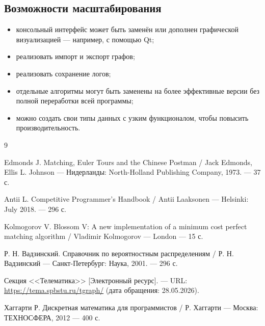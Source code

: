 \documentclass[14pt,a4paper]{extarticle}
\begin{document}
\subsection{Возможности масштабирования}

\begin{itemize}
    \item консольный интерфейс может быть заменён или дополнен графической визуализацией --- например, с помощью Qt;
    \item реализовать импорт и экспорт графов;
    \item реализовать сохранение логов;
    \item отдельные алгоритмы могут быть заменены на более эффективные версии без полной переработки всей программы;
    \item можно создать свои типы данных с узким функционалом, чтобы повысить производительность.
\end{itemize}

\newpage

\begin{thebibliography}{9}
\label{lit}

     Edmonds J. Matching, Euler Tours and the Chinese Postman / Jack Edmonds, Ellis L. Johnson --- Нидерланды: North-Holland Publishing Company, 1973. --- 37 с.

     Antii L. Competitive Programmer's Handbook / Antii Laaksonen --- Helsinki: July 2018. --- 296 с.

     Kolmogorov V. Blossom V: A new implementation of a minimum cost perfect matching algorithm / Vladimir Kolmogorov --- London --- 15 с.

     Р. Н. Вадзинский. Справочник по вероятностным распределениям / Р. Н. Вадзинский --- Санкт-Петербург: Наука, 2001. --- 296 с.

     Секция <<Телематика>> [Электронный ресурс]. --- URL: \url{https://tema.spbstu.ru/tgraph/} (дата обращения: 28.05.2026).

     Хаггарти Р. Дискретная математика для программистов / Р. Хаггарти --- Москва: ТЕХНОСФЕРА, 2012 --- 400 с.

\end{thebibliography}

%
\end{document}

